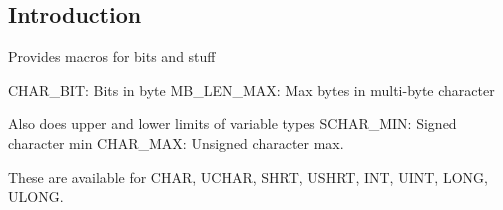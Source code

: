 
\subsection{Introduction}

Provides macros for bits and stuff

CHAR\_BIT: Bits in byte
MB\_LEN\_MAX: Max bytes in multi-byte character


Also does upper and lower limits of variable types
SCHAR\_MIN: Signed character min
CHAR\_MAX: Unsigned character max.

These are available for CHAR, UCHAR, SHRT, USHRT, INT, UINT, LONG, ULONG.

